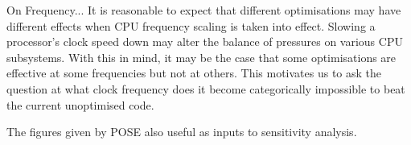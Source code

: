 


On Frequency...
It is reasonable to expect that different optimisations may have different effects when CPU frequency scaling is taken into effect. Slowing a processor's clock speed down may alter the balance of pressures on various CPU subsystems. With this in mind, it may be the case that some optimisations are effective at some frequencies but not at others. This motivates us to ask the question at what clock frequency does it become categorically impossible to beat the current unoptimised code.

The figures given by POSE also useful as inputs to sensitivity analysis.





